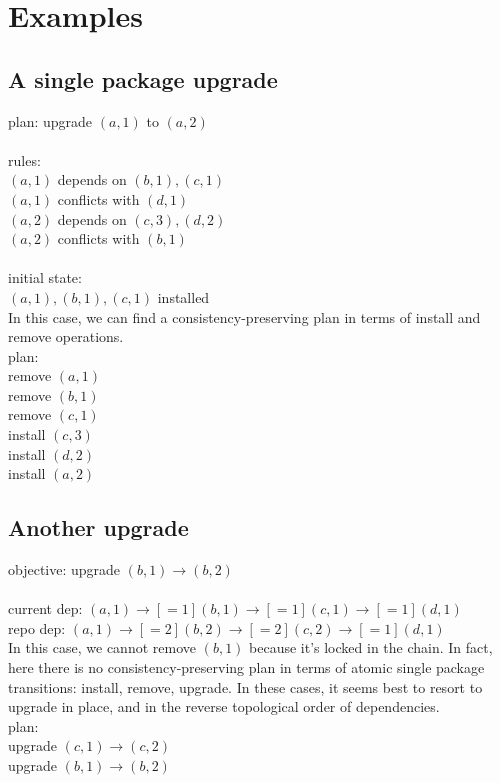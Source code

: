 \documentclass[a4paper,11pt]{article}
\begin{document}
\section{Examples}

\subsection{A single package upgrade}

plan: upgrade $(a,1)$ to $(a,2)$\\
\\
rules:\\
  $(a,1)$ depends on $(b,1), (c,1)$ \\
  $(a,1)$ conflicts with $(d,1)$\\
  $(a,2)$ depends on $(c,3), (d,2)$\\
  $(a,2)$ conflicts with $(b,1)$\\
\\
initial state:\\
  $(a,1), (b,1), (c,1)$ installed \\

In this case, we can find a consistency-preserving plan in terms of
install and remove operations.
\\
plan:\\
  remove $(a,1)$\\
  remove $(b,1)$\\
  remove $(c,1)$\\
  install $(c,3)$\\
  install $(d,2)$\\
  install $(a,2)$\\

\subsection{Another upgrade}

objective: upgrade $(b,1) \to (b,2)$\\
\\
current dep: $(a,1) \to[=1] (b,1) \to[=1] (c,1) \to[=1] (d,1)$\\
repo dep: \nobreakspace{} \nobreakspace$(a,1) \to[=2] (b,2) \to[=2] (c,2) \to[=1] (d,1)$\\

In this case, we cannot remove $(b,1)$ because it's locked in the
chain. In fact, here there is no consistency-preserving plan in terms
of atomic single package transitions: install, remove, upgrade. In
these cases, it seems best to resort to upgrade in place, and in the
reverse topological order of dependencies.
\\
plan:\\
 upgrade $(c,1) \to (c,2)$\\
 upgrade $(b,1) \to (b,2)$\\
\end{document}
